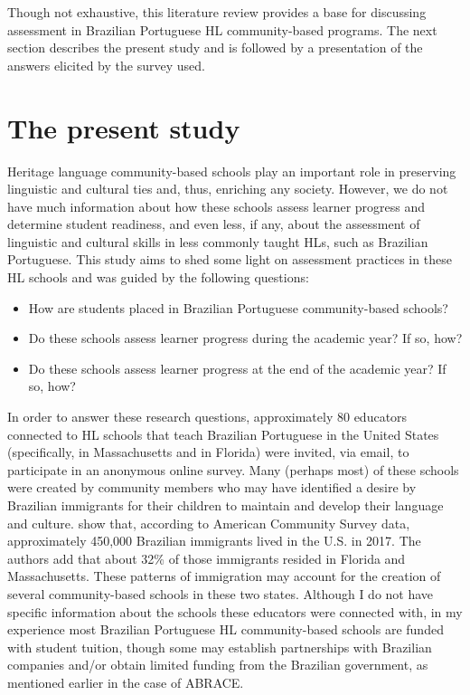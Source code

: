 \documentclass[output=paper]{langscibook}
\begin{document}
Though not exhaustive, this literature review provides a base for discussing assessment in Brazilian Portuguese HL community-based programs. The next section describes the present study and is followed by a presentation of the answers elicited by the survey used.

\section{The present study}\label{sec:6:4}


  Heritage language community-based schools play an important role in preserving linguistic and cultural ties \citep{Kondo-Brown2010} and, thus, enriching any society. However, we do not have much information about how these schools assess learner progress and determine student readiness, and even less, if any, about the assessment of linguistic and cultural skills in less commonly taught HLs, such as Brazilian Portuguese. This study aims to shed some light on assessment practices in these HL schools and was guided by the following questions:

\begin{itemize}
\item  \begin{sloppypar}How are students placed in Brazilian Portuguese community-based schools?\end{sloppypar}
\item  Do these schools assess learner progress during the academic year? If so, how?
\item  Do these schools assess learner progress at the end of the academic year? If so, how?
\end{itemize}

In order to answer these research questions, approximately 80 educators connected to HL schools that teach Brazilian Portuguese in the United States (specifically, in Massachusetts and in Florida) were invited, via email, to participate in an anonymous online survey. Many (perhaps most) of these schools were created by community members who may have identified a desire by Brazilian immigrants for their children to maintain and develop their language and culture. \citet{BlizzardBatalova2019} show that, according to American Community Survey data, approximately 450,000 Brazilian immigrants lived in the U.S. in 2017. The authors add that about 32\% of those immigrants resided in Florida and Massachusetts. These patterns of immigration may account for the creation of several community-based schools in these two states. Although I do not have specific information about the schools these educators were connected with, in my experience most Brazilian Portuguese HL community-based schools are funded with student tuition, though some may establish partnerships with Brazilian companies and/or obtain limited funding from the Brazilian government, as mentioned earlier in the case of ABRACE.
\end{document}
